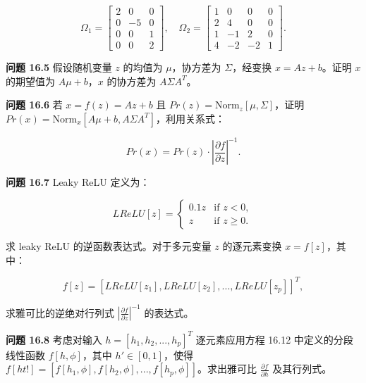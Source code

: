 \documentclass[lang=cn,newtx,10pt,scheme=chinese]{elegantbook}
\begin{document}
\begin{equation}
\Omega_1 = \begin{bmatrix}
2 & 0 & 0 \\
0 & -5 & 0 \\
0 & 0 & 1 \\
0 & 0 & 2
\end{bmatrix}, \quad
\Omega_2 = \begin{bmatrix}
1 & 0 & 0 & 0\\
2 & 4 & 0 & 0\\
1 & -1 & 2 & 0\\
4 & -2 & -2 & 1
\end{bmatrix}. 
\end{equation}

\textbf{问题 16.5} 假设随机变量 \(z\) 的均值为 \(\mu\)，协方差为 \(\Sigma\)，经变换 \(x = Az + b\)。证明 \(x\) 的期望值为 \(A\mu + b\)，\(x\) 的协方差为 \(A\Sigma A^T\)。

\textbf{问题 16.6} 若 \(x = f(z) = Az + b\) 且 \(Pr(z) = \text{Norm}_z[\mu, \Sigma]\)，证明 \(Pr(x) = \text{Norm}_x[A\mu + b, A\Sigma A^T]\)，利用关系式：

\begin{equation}
Pr(x) = Pr(z) \cdot \left| \frac{\partial f}{\partial z} \right|^{-1}. 
\end{equation}

\textbf{问题 16.7} Leaky ReLU 定义为：

\begin{equation}
LReLU[z] = \begin{cases}
0.1z & \text{if } z < 0, \\
z & \text{if } z \geq 0.
\end{cases} 
\end{equation}

求 leaky ReLU 的逆函数表达式。对于多元变量 \(z\) 的逐元素变换 \(x = f[z]\)，其中：

\begin{equation}
f[z] = [LReLU[z_1], LReLU[z_2], ..., LReLU[z_p]]^T, 
\end{equation}

求雅可比的逆绝对行列式 \(\left| \frac{\partial f}{\partial z} \right|^{-1}\) 的表达式。

\textbf{问题 16.8} 考虑对输入 \(h = [h_1, h_2, ..., h_p]^T\) 逐元素应用方程 16.12 中定义的分段线性函数 \(f[h, \phi]\)，其中 \(h' \in [0, 1]\)，使得 \(f[ht!] = [f[h_1, \phi], f[h_2, \phi], ..., f[h_p, \phi]]\)。求出雅可比 \(\frac{\partial f}{\partial h}\) 及其行列式。
\end{document}
